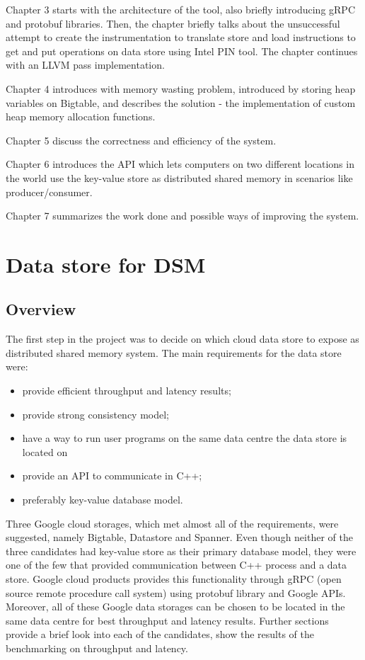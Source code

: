 \documentclass[bsc,frontabs,twoside,singlespacing,parskip,deptreport]{infthesis}     %
\begin{document}
Chapter 3 starts with the architecture of the tool, also briefly introducing gRPC and protobuf libraries. Then, the chapter briefly talks about the unsuccessful attempt to create the instrumentation to translate store and load instructions to get and put operations on data store using Intel PIN tool. The chapter continues with an LLVM pass implementation.

Chapter 4 introduces with memory wasting problem, introduced by storing heap variables on Bigtable, and describes the solution - the implementation of custom heap memory allocation functions. 

Chapter 5 discuss the correctness and efficiency of the system. 

Chapter 6 introduces the API which lets computers on two different locations in the world use the key-value store as distributed shared memory in scenarios like producer/consumer.

Chapter 7 summarizes the work done and possible ways of improving the system.

\chapter{Data store for DSM}

\section{Overview}

The first step in the project was to decide on which cloud data store to expose as distributed shared memory system. The main requirements for the data store were:

\begin{itemize}
\item
provide efficient throughput and latency results;
\item
provide strong consistency model;
\item
have a way to run user programs on the same data centre the data store is located on
\item
provide an API to communicate in C++;
\item
preferably key-value database model.
\end{itemize}

Three Google cloud storages, which met almost all of the requirements, were suggested, namely Bigtable, Datastore and Spanner. Even though neither of the three candidates had key-value store as their primary database model, they were one of the few that provided communication between C++ process and a data store. Google cloud products provides this functionality through gRPC (open source remote procedure call system) using protobuf library and Google APIs. Moreover, all of these Google data storages can be chosen to be located in the same data centre for best throughput and latency results. Further sections provide a brief look into each of the candidates, show the results of the benchmarking on throughput and latency.
\end{document}
